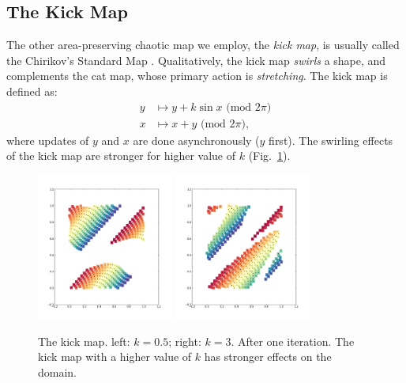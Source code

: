 \documentclass[12pt,draft]{reedmcm}
\begin{document}
\subsection{The Kick Map}
The other area-preserving chaotic map we employ, the \textit{kick map}, is usually called the Chirikov's Standard Map \citep{ott}.
Qualitatively, the kick map \textit{swirls} a shape, and complements the cat map, whose primary action is \textit{stretching}.
The kick map is defined as:
\begin{align*}
  y &\mapsto y + k \sin x \mbox{ (mod $2\pi$)} \\
  x &\mapsto x + y \mbox{ (mod $2\pi$)},
\end{align*}
where updates of $y$ and $x$ are done asynchronously ($y$ first).
The swirling effects of the kick map are stronger for higher value of $k$ (Fig.~\ref{fig:kickmap_demo1}).
%
\begin{figure}[h!]
  \centering
  \includegraphics[width=0.4\textwidth]{kickmap_05}
  \hspace{2cm}
  \includegraphics[width=0.4\textwidth]{kickmap_3}
  \caption{The kick map. left: $k=0.5$; right: $k = 3$. After one iteration. 
    The kick map with a higher value of $k$ has stronger effects on the domain.
  }
  \label{fig:kickmap_demo1}
\end{figure}
%
\end{document}
